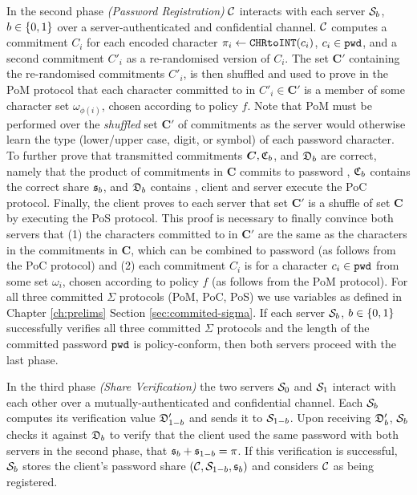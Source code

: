 In the second phase \emph{(Password Registration)} $\mathcal{C}$ interacts with each server $\mathcal{S}_b$, $b\in\{0,1\}$ over a server-authenticated and confidential channel. $\mathcal{C}$ computes a commitment $C_i$ for each encoded character $\pi_i\gets\texttt{CHRtoINT}(c_i)$, $c_i\in\mathtt{pwd}$, and a second commitment $C'_i$ as a re-randomised version of $C_i$.
The set $\bm C'$ containing the re-randomised commitments $C'_i$, is then shuffled and used to prove in the \acl{PoM} protocol that each character committed to in $C'_i\in\bm C'$ is a member of some character set $\omega_{\phi(i)}$, chosen according to policy $f$.
Note that \ac{PoM} must be performed over the \emph{shuffled} set $\bm C'$ of commitments as the server would otherwise learn the type (lower/upper case, digit, or symbol) of each password character.
To further prove that transmitted commitments ${\bm C}, \mathfrak{C}_b$, and $\mathfrak{D}_b$ are correct, namely that the product of commitments in $\bm C$ commits to password \pwd, $\mathfrak{C}_b$ contains the correct share $\mathfrak{s}_b$, and $\mathfrak{D}_b$ contains \pwd, client and server execute the \acl{PoC} protocol. 
Finally, the client proves to each server that set $\bm C'$ is a shuffle of set $\bm C$ by executing the \acl{PoS} protocol. 
This proof is necessary to finally convince both servers that 
(1) the characters committed to in $\bm C'$ are the same as the characters in the commitments in $\bm C$, which can be combined to password \pwd (as follows from the \ac{PoC} protocol) and 
(2) each commitment $C_i$ is for a character $c_i\in\mathtt{pwd}$ from some set $\omega_{i}$, chosen according to policy $f$ (as follows from the \ac{PoM} protocol).  
For all three committed $\Sigma$ protocols (\ac{PoM}, \ac{PoC}, \ac{PoS}) we use variables as defined in Chapter \ref{ch:prelims} Section \ref{sec:commited-sigma}.
If each server $\mathcal{S}_b$, $b\in\{0,1\}$ successfully verifies all three committed $\Sigma$ protocols and the length of the committed password $\mathtt{pwd}$ is policy-conform, then both servers proceed with the last phase. 

In the third phase \emph{(Share Verification)} the two servers $\mathcal{S}_0$ and $\mathcal{S}_1$ interact with each other over a mutually-authenticated and confidential channel. Each $\mathcal{S}_b$ computes its verification value $\mathfrak{D}'_{1-b}$ and sends it to $\mathcal{S}_{1-b}$.
Upon receiving $\mathfrak{D}'_{b}$, $\mathcal{S}_b$ checks it against $\mathfrak{D}_b$ to verify that the client used the same password with both servers in the second phase, \ie that $\mathfrak{s}_b+\mathfrak{s}_{1-b}=\pi$.
If this verification is successful, $\mathcal{S}_b$ stores the client's password share $(\mathcal{C},\mathcal{S}_{1-b},\mathfrak{s}_b)$ and considers $\mathcal{C}$ as being registered.

